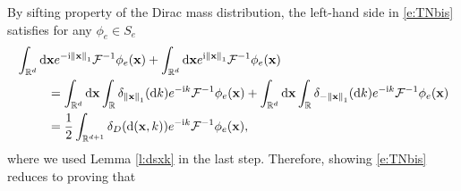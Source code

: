 \documentclass[11pt,A4,twoside]{article}
\numberwithin{equation}{section}
\renewcommand{\vec}{\mathbf}
\newcommand{\Fi}{\mathcal{F}^{-1}}
\renewcommand*\d{\mathop{}\!\mathrm{d}}
\newcommand{\norml}[1]{\left\Vert#1 \right\Vert_{1}}
\newcommand{\x}{\mathbf{x}}
\newcommand{\R}{\mathbbm{R}}
\newcommand{\intRd}{\int_{\R^d}}
\def\qqq{\;\;\;\;\;\;\;\;\;}
\theoremstyle{definition}
\theoremstyle{remark}
\def\R{\mathbb{R}}
\def\phie{\phi_e}
\def\theS{D}
\def\thermi{{\rm i}}%
\begin{document}
By sifting property of the Dirac mass distribution, 
the left-hand side in \eqref{e:TNbis} satisfies for any $\phie\in S_e$
\begin{align*}%
  &     \intRd \d\x  e^{-\thermi  \norml{\x}} \Fi \phi_e (\x)+     \intRd \d\x  e^{ \thermi  \norml{\x}} \Fi \phi_e (\x) \nonumber\\
&\qqq  =   \intRd \d\x \int_{\R} \delta_{\norml{\x}}(\d k ) e^{-\thermi k} \Fi \phi_e (\x) +  \intRd \d\x \int_{\R} \delta_{-\norml{\x}}(\d k )e^{-\thermi k} \Fi \phi_e (\x) %
\\&\qqq= \frac{1}{2}\int_{\R^{d+1}} \delta_\theS(\d(\vec x, k)) e^{-\thermi k} \Fi \phi_e (\x) ,
\end{align*}
where we used Lemma \ref{l:dsxk} in the last step. 
Therefore, showing \eqref{e:TNbis} reduces to proving that
\end{document}
